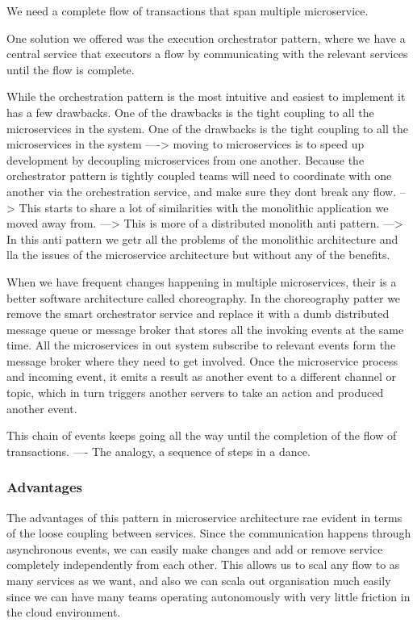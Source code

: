 \documentclass[a4paper, 11pt]{book}
\begin{document}
    We need a complete flow of transactions that span multiple microservice.

    One solution we offered was the execution orchestrator pattern, where we have a central service that executors a flow by communicating with the relevant services until the flow is complete.

    While the orchestration pattern is the most intuitive and easiest to implement it has a few drawbacks.
    One of the drawbacks is the tight coupling to all the microservices in the system.
    One of the drawbacks is the tight coupling to all the microservices in the system
    ----> moving to microservices is to speed up development by decoupling microservices from one another.
    Because the orchestrator pattern is tightly coupled teams will need to coordinate with one another via the orchestration service, and make sure they dont break any flow.
    --> This starts to share a lot of similarities with the monolithic application we moved away from.
    ---> This is more of a distributed monolith anti pattern.
    ---> In this anti pattern we getr all the problems of the monolithic architecture and lla the issues of the microservice architecture but without any of the benefits.

    When we have frequent changes happening in multiple microservices, their is a better software architecture called choreography.
    In the choreography patter we remove the smart orchestrator service and replace it with a dumb distributed message queue or message broker that stores all the invoking events at the same time.
    All the microservices in out system subscribe to relevant events form the message broker where they need to get involved.
    Once the microservice process and incoming event, it emits a result as another event to a different channel or topic, which in turn triggers another servers to take an action and produced another event.

    This chain of events keeps going all the way until the completion of the flow of transactions.
    ---- The analogy, a sequence of steps in a dance.

    \subsubsection{Advantages}
    The advantages of this pattern in microservice architecture rae evident in terms of the loose coupling between services.
    Since the communication happens through asynchronous events, we can easily make changes and add or remove service completely independently from each other.
    This allows us to scal any flow to as many services as we want, and also we can scala out organisation much easily since we can have many teams operating autonomously with very little friction in the cloud environment.
\end{document}
